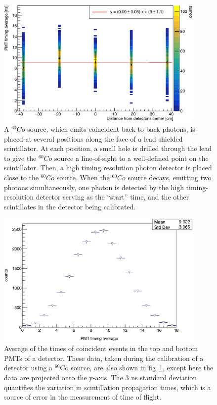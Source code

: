 \begin{figure}[H]
    \centering
    \includegraphics[width = 0.9\textwidth]{Content/Methods/CO60Validation.png}
    \caption{A $^{60}Co$ source, which emits coincident back-to-back photons, is placed at several positions along the face of a lead shielded scintillator.
    At each position, a small hole is drilled through the lead to give the $^{60}Co$ source a line-of-sight to a well-defined point on the scintillator.
    Then, a high timing resolution photon detector is placed close to the $^{60}Co$ source.
    When the $^{60}Co$ source decays, emitting two photons simultaneously, one photon is detected by the high timing-resolution detector serving as the ``start'' time, and the other scintillates in the detector being calibrated.}
    \label{fig:Co60Validation}
\end{figure}
\begin{figure}
    \centering
    \includegraphics[width = 0.9\textwidth]{Content/Methods/CO60ValidationProject.png}
    \caption{Average of the times of coincident events in the top and bottom PMTs of a detector.
    These data, taken during the calibration of a detector using a $^{60}$Co source, are also shown in fig~\ref{fig:Co60Validation}, except here the data are projected onto the y-axis.
    The 3 ns standard deviation quantifies the variation in scintillation propagation times, which is a source of error in the measurement of time of flight.}
    \label{fig:Co60ValidationProject}
\end{figure}
